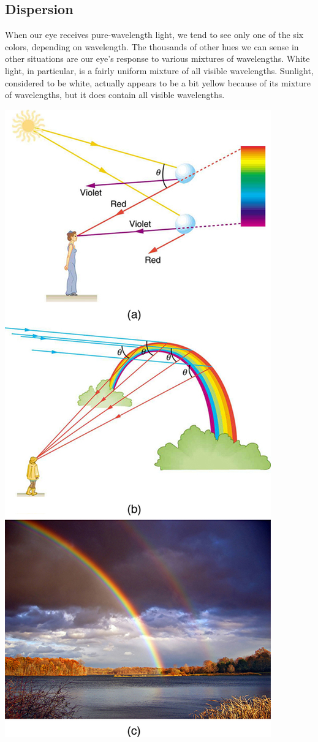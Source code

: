 \documentclass[11pt]{article}
\begin{document}
	\subsection*{Dispersion}
	When our eye receives pure-wavelength light, we tend to see only one of the six colors, depending on wavelength. The thousands of other hues we can sense in other situations are our eye’s response to various mixtures of wavelengths. White light, in particular, is a fairly uniform mixture of all visible wavelengths. Sunlight, considered to be white, actually appears to be a bit yellow because of its mixture of wavelengths, but it does contain all visible wavelengths.
	\begin{center}
		\includegraphics[scale=0.5]{Dispersion}
	\end{center}
\end{document}
